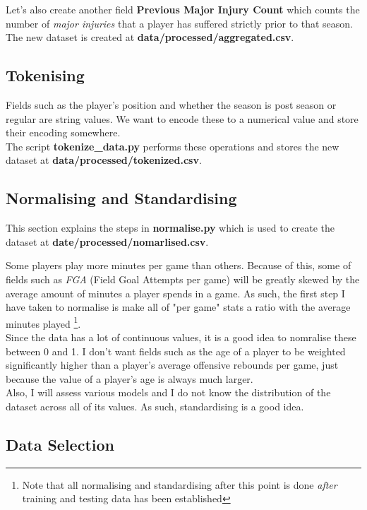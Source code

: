 \documentclass{article}
\begin{document}
Let's also create another field \textbf{Previous Major Injury Count} which counts the
number of \emph{major injuries} that a player has suffered strictly prior to that season.
The new dataset is created at \textbf{data/processed/aggregated.csv}.

\subsection*{Tokenising}

Fields such as the player's position and whether the season is post season
or regular are string values. We want to encode these to a numerical value and
store their encoding somewhere.\\

The script \textbf{tokenize\_data.py} performs these operations and stores the
new dataset at \textbf{data/processed/tokenized.csv}.

\subsection*{Normalising and Standardising}

This section explains the steps in \textbf{normalise.py} which is used to
create the dataset at \textbf{date/processed/nomarlised.csv}.

Some players play more minutes per game than others. Because of this, some of fields
such as \emph{FGA} (Field Goal Attempts per game) will be greatly skewed by the
average amount of minutes a player spends in a game. As such, the first step
I have taken to normalise is make all of "per game" stats a ratio with
the average minutes played
\footnote{Note that all normalising and standardising after this point is done \emph{after} training and testing data has been established}.\\

Since the data has a lot of continuous values, it is a good idea to nomralise
these between 0 and 1. I don't want fields such as the age of a player to be weighted significantly
higher than a player's average offensive rebounds per game, just because the value of a player's
age is always much larger.\\

Also, I will assess various models and I do not know the distribution of the dataset
across all of its values. As such, standardising is a good idea.

\subsection*{Data Selection}
\end{document}
